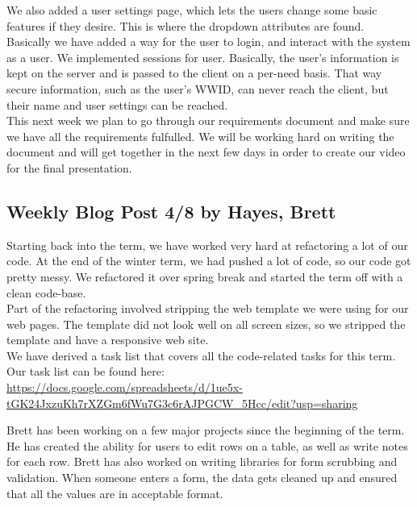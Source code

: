 \documentclass[10pt, onecolumn, twoside, peerreview]{IEEEtran}
\begin{document}
​We also added a user settings page, which lets the users change some basic features if they desire. This is where the dropdown attributes are found.\\

Basically we have added a way for the user to login, and interact with the system as a user. We implemented sessions for user. Basically, the user's information is kept on the server and is passed to the client on a per-need basis. That way secure information, such as the user's WWID, can never reach the client, but their name and user settings can be reached.\\

This next week we plan to go through our requirements document and make sure we have all the requirements fulfulled. We will be working hard on writing the document and will get together in the next few days in order to create our video for the final presentation.

\subsection{Weekly Blog Post 4/8 by Hayes, Brett}
Starting back into the term, we have worked very hard at refactoring a lot of our code. ​At the end of the winter term, we had pushed a lot of code, so our code got pretty messy. We refactored it over spring break and started the term off with a clean code-base.\\

Part of the refactoring involved stripping the web template we were using for our web pages. The template did not look well on all screen sizes, so we stripped the template and have a responsive web site.\\

We have derived a task list that covers all the code-related tasks for this term. Our task list can be found here:\\

\url{https://docs.google.com/spreadsheets/d/1ue5x-tGK24JxzuKh7rXZGm6fWu7G3c6rAJPGCW_5Hcc/edit?usp=sharing}


Brett has been working on a few major projects since the beginning of the term. He has created the ability for users to edit rows on a table, as well as write notes for each row. Brett has also worked on writing libraries for form scrubbing and validation. When someone enters a form, the data gets cleaned up and ensured that all the values are in acceptable format.\\
\end{document}

